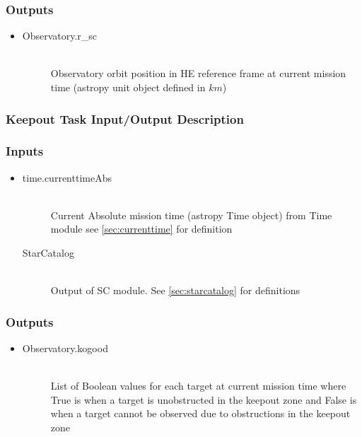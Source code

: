 \documentclass[cleanfoot]{asme2ej}
\begin{document}
\subsubsection*{Outputs}
\begin{itemize}
    \item
    \begin{description}
        \item[Observatory.r\_sc] \hfill \\
        Observatory orbit position in HE reference frame at current mission time (astropy unit object defined in $ km $)
    \end{description}
\end{itemize}

\subsubsection{Keepout Task Input/Output Description} \label{sec:keepouttask}

\subsubsection*{Inputs}
\begin{itemize}
    \item
    \begin{description}
        \item[time.currenttimeAbs] \hfill \\
        Current Absolute mission time (astropy Time object) from Time module see \ref{sec:currenttime} for definition
        \item[StarCatalog] \hfill \\
        Output of SC module. See \ref{sec:starcatalog} for definitions
    \end{description}
\end{itemize}

\subsubsection*{Outputs}
\begin{itemize}
    \item 
    \begin{description}
        \item[Observatory.kogood] \hfill \\
        List of Boolean values for each target at current mission time where True is when a target is unobstructed in the keepout zone and False is when a target cannot be observed due to obstructions in the keepout zone
    \end{description}
\end{itemize}
\end{document}
